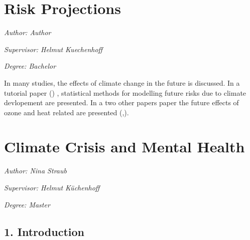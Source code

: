 \documentclass[
]{krantz}
\begin{document}
\chapter{Risk Projections}\label{he4}

\emph{Author: Author}

\emph{Supervisor: Helmut Kuechenhoff}

\emph{Degree: Bachelor}

In many studies, the effects of climate change in the future is discussed.
In a tutorial paper (\citet{vicedo}) , statistical methods for modelling future risks due to climate devlopement are presented. In a two other papers paper the future effects of ozone and heat related are presented (\citet{domingo},\citet{chen}).

\chapter{Climate Crisis and Mental Health}\label{menh3}

\emph{Author: Nina Straub}

\emph{Supervisor: Helmut Küchenhoff}

\emph{Degree: Master}

\section{1. Introduction}\label{introduction-8}
\end{document}

